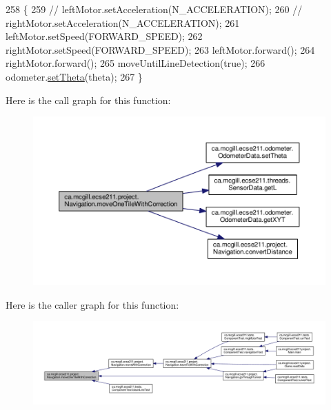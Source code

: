 \begin{DoxyCode}
258                                                       \{
259     \textcolor{comment}{// leftMotor.setAcceleration(N\_ACCELERATION);}
260     \textcolor{comment}{// rightMotor.setAcceleration(N\_ACCELERATION);}
261     leftMotor.setSpeed(FORWARD\_SPEED);
262     rightMotor.setSpeed(FORWARD\_SPEED);
263     leftMotor.forward();
264     rightMotor.forward();
265     moveUntilLineDetection(\textcolor{keyword}{true});
266     odometer.\hyperlink{classca_1_1mcgill_1_1ecse211_1_1odometer_1_1_odometer_data_a419b8f07c2c5374411c8e62298e9a402}{setTheta}(theta);
267   \}
\end{DoxyCode}
Here is the call graph for this function\+:\nopagebreak
\begin{figure}[H]
\begin{center}
\leavevmode
\includegraphics[width=350pt]{classca_1_1mcgill_1_1ecse211_1_1project_1_1_navigation_afbe677941e2bd44e35452e1eff508ae9_cgraph}
\end{center}
\end{figure}
Here is the caller graph for this function\+:\nopagebreak
\begin{figure}[H]
\begin{center}
\leavevmode
\includegraphics[width=350pt]{classca_1_1mcgill_1_1ecse211_1_1project_1_1_navigation_afbe677941e2bd44e35452e1eff508ae9_icgraph}
\end{center}
\end{figure}
\mbox{\label{classca_1_1mcgill_1_1ecse211_1_1project_1_1_navigation_a48eeb9ae2da23664421e8da5642054c7}} 
